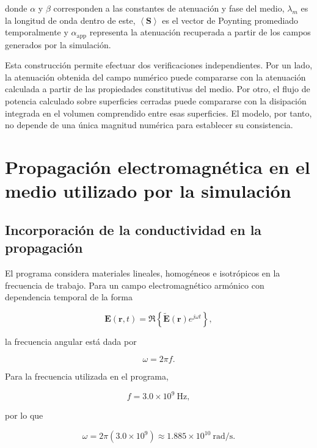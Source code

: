 donde $\alpha$ y $\beta$ corresponden a las constantes de atenuación y fase del medio, $\lambda_m$ es la longitud de onda dentro de este, $\left\langle\mathbf{S}\right\rangle$ es el vector de Poynting promediado temporalmente y $\alpha_{\mathrm{app}}$ representa la atenuación recuperada a partir de los campos generados por la simulación.

Esta construcción permite efectuar dos verificaciones independientes. Por un lado, la atenuación obtenida del campo numérico puede compararse con la atenuación calculada a partir de las propiedades constitutivas del medio. Por otro, el flujo de potencia calculado sobre superficies cerradas puede compararse con la disipación integrada en el volumen comprendido entre esas superficies. El modelo, por tanto, no depende de una única magnitud numérica para establecer su consistencia.

\section{Propagación electromagnética en el medio utilizado por la simulación}

\subsection{Incorporación de la conductividad en la propagación}

El programa considera materiales lineales, homogéneos e isotrópicos en la frecuencia de trabajo. Para un campo electromagnético armónico con dependencia temporal de la forma

\begin{equation}
\mathbf{E}(\mathbf{r},t)
=
\Re\left\{
\widetilde{\mathbf{E}}(\mathbf{r})
e^{j\omega t}
\right\},
\end{equation}

la frecuencia angular está dada por

\begin{equation}
\omega=2\pi f.
\end{equation}

Para la frecuencia utilizada en el programa,

\begin{equation}
f=3.0\times10^{9}~\mathrm{Hz},
\end{equation}

por lo que

\begin{equation}
\omega
=
2\pi(3.0\times10^{9})
\approx
1.885\times10^{10}~\mathrm{rad/s}.
\end{equation}

